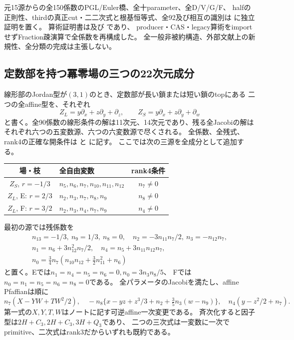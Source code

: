 \documentclass[a4paper,11pt]{ltjsarticle}
\theoremstyle{definition}
\begin{document}
元15源からの全150係数のPGL/Euler橋、全十parameter、全D/V/G/F、
halfの正則性、thirdの真正cut・二二次式と根基恒等式、全92及び相互の識別は
に独立証明を置く。
算術証明書は及び
であり、
producer・CAS・legacy算術をimportせずFraction疎演算で全係数を再構成した。
全一般非被約構造、外部文献上の新規性、全分類の完成は主張しない。

\subsection{定数部を持つ冪零場の三つの22次元成分}
線形部のJordan型が$(3,1)$のとき、定数部が長い鎖または短い鎖のtopにある
二つの全affine型を、それぞれ
\[
 Z_L=y\partial_x+z\partial_y+\partial_z,\qquad
 Z_S=y\partial_x+z\partial_y+\partial_w
\]
と書く。全90係数の線形条件の解は11次元、14次元であり、残る全Jacobiの解は
それぞれ六つの五変数源、六つの六変数源で尽くされる。
全係数、全残式、rank4の正確な開条件は
と
に記す。
ここでは次の三源を全成分として追加する。
\begin{center}\small
\begin{tabular}{c|l|c}
場・枝&全自由変数&rank4条件\\\hline
$Z_S$, $r=-1/3$&$n_5,n_6,n_7,n_{10},n_{11},n_{12}$&$n_7\ne0$\\
$Z_L$, E: $r=2/3$&$n_2,n_3,n_7,n_8,n_9$&$n_8\ne0$\\
$Z_L$, F: $r=3/2$&$n_2,n_3,n_4,n_7,n_9$&$n_4\ne0$
\end{tabular}
\end{center}
最初の源では残係数を
\[
\begin{gathered}
 n_{13}=-1/3,\ n_9=1/3,\ n_8=0,\quad
 n_2=-3n_{11}n_7/2,\ n_3=-n_{12}n_7,\\
 n_1=n_6+3n_{12}^2n_7/2,\quad n_4=n_5+3n_{11}n_{12}n_7,\\
 n_0=\tfrac34n_7(n_{10}n_{12}+\tfrac32n_{11}^2+n_6)
\end{gathered}
\]
と置く。Eでは$n_1=n_4=n_5=n_6=0,n_0=3n_3n_8/5$、
Fでは$n_0=n_1=n_5=n_6=n_8=0$である。
全パラメータのJacobiを満たし、affine Pfaffianは順に
\[
 n_7(X-YW+TW^2/2),\quad
 -n_8\{x-yz+z^3/3+n_2+\tfrac35n_3(w-n_9)\},\quad
 n_4(y-z^2/2+n_7).
\]
第一式の$X,Y,T,W$はノートに記す可逆affine一次変更である。
斉次化すると因子型は$2H+C_3,2H+C_3,3H+Q_3$であり、
二つの三次式は一変数に一次でprimitive、二次式はrank3だからいずれも既約である。
\end{document}
